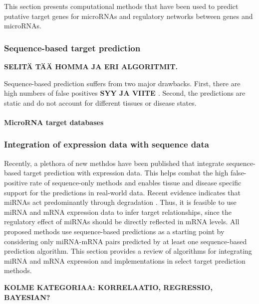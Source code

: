 This section presents computational methods that have been used to predict
putative target genes for microRNAs and regulatory networks between genes and
microRNAs.





\subsubsection{Sequence-based target prediction}\label{sequence-based-target-
prediction}

\textbf{SELITÄ TÄÄ HOMMA JA ERI ALGORITMIT.}

Sequence-based prediction suffers from two major drawbacks. First, there are
high numbers of false positives \textbf{SYY JA VIITE
\citep{Sethupathy2006?}}. Second, the predictions are static and do not
account for different tissues or disease states.


\paragraph{MicroRNA target databases}





\subsubsection{Integration of expression data with sequence data}\label
{integration-of-expression-data-with-sequence-data}

Recently, a plethora of new methdos have been published that integrate
sequence-based target prediction with expression data. This helps combat the
high false-positive rate of sequence-only methods and enables tissue and
disease specific support for the predictions in real-world data. Recent
evidence indicates that miRNAs act predominantly through degradation
\citep{CITE}. Thus, it is feasible to use miRNA and mRNA expression data to
infer target relationships, since the regulatory effect of miRNAs should be
directly reflected in mRNA levels. All proposed methods use sequence-based
predictions as a starting point by considering only miRNA-mRNA pairs predicted
by at least one sequence-based prediction algorithm. This section provides a
review of algorithms for integrating miRNA and mRNA expression and
implementations in select target prediction methods.

\textbf{KOLME KATEGORIAA: KORRELAATIO, REGRESSIO, BAYESIAN?}



